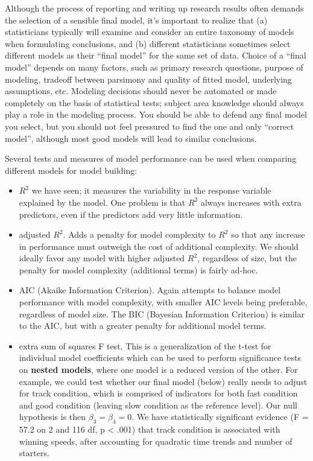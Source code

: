 \documentclass[
]{krantz}
\providecommand{\tightlist}{%
  \setlength{\itemsep}{0pt}\setlength{\parskip}{0pt}}
\begin{document}
Although the process of reporting and writing up research results often demands the selection of a sensible final model, it's important to realize that (a) statisticians typically will examine and consider an entire taxonomy of models when formulating conclusions, and (b) different statisticians sometimes select different models as their ``final model'' for the same set of data. Choice of a ``final model'' depends on many factors, such as primary research questions, purpose of modeling, tradeoff between parsimony and quality of fitted model, underlying assumptions, etc. Modeling decisions should never be automated or made completely on the basis of statistical tests; subject area knowledge should always play a role in the modeling process. You should be able to defend any final model you select, but you should not feel pressured to find the one and only ``correct model'', although most good models will lead to similar conclusions.

Several tests and measures of model performance can be used when comparing different models for model building:

\begin{itemize}
\tightlist
\item
  \(R^2\) we have seen; it measures the variability in the response variable explained by the model. One problem is that \(R^2\) always increases with extra predictors, even if the predictors add very little information.
\item
  adjusted \(R^2\). Adds a penalty for model complexity to \(R^2\) so that any increase in performance must outweigh the cost of additional complexity. We should ideally favor any model with higher adjusted \(R^2\), regardless of size, but the penalty for model complexity (additional terms) is fairly ad-hoc.
\item
  AIC (Akaike Information Criterion). Again attempts to balance model performance with model complexity, with smaller AIC levels being preferable, regardless of model size. The BIC (Bayesian Information Criterion) is similar to the AIC, but with a greater penalty for additional model terms.
\item
  extra sum of squares F test. This is a generalization of the t-test for individual model coefficients which can be used to perform significance tests on \textbf{nested models}, where one model is a reduced version of the other. For example, we could test whether our final model (below) really needs to adjust for track condition, which is comprised of indicators for both fast condition and good condition (leaving slow condition as the reference level). Our null hypothesis is then \(\beta_{3}=\beta_{4}=0\). We have statistically significant evidence (F = 57.2 on 2 and 116 df, p \textless{} .001) that track condition is associated with winning speeds, after accounting for quadratic time trends and number of starters.
\end{itemize}
\end{document}
